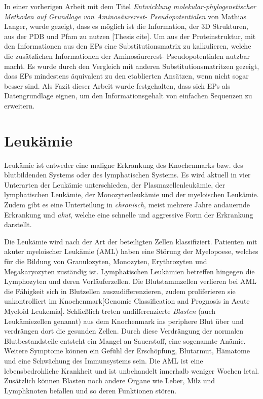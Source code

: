 In einer vorherigen Arbeit mit dem Titel \emph{Entwicklung molekular-phylogenetischer Methoden auf Grundlage von Aminosäurerest- Pseudopotentialen} von Mathias Langer, wurde gezeigt, dass es möglich ist die Information, der 3D Strukturen, aus der PDB und Pfam zu nutzen [Thesis cite]. Um aus der Proteinstruktur, mit den Informationen aus den EPs eine Substitutionsmatrix zu kalkulieren, welche die zusätzlichen Informationen der Aminosäurerest- Pseudopotentialen nutzbar macht. Es wurde durch den Vergleich mit anderen Substitutionsmatritzen gezeigt, dass EPs mindestens äquivalent zu den etablierten Ansätzen, wenn nicht sogar besser sind. Als Fazit dieser Arbeit wurde festgehalten, dass sich EPs als Datengrundlage eignen, um den Informationsgehalt von einfachen Sequenzen zu erweitern.


\section{Leukämie}
Leukämie ist entweder eine maligne Erkrankung des Knochenmarks bzw. des blutbildenden Systems oder des lymphatischen Systems. Es wird aktuell in vier Unterarten der Leukämie unterschieden, der Plasmazellenleukämie, der lymphatischen Leukämie, der Monozytenleukämie und der myeloischen Leukämie. Zudem gibt es eine Unterteilung in \emph{chronisch}, meist mehrere Jahre andauernde Erkrankung und \emph{akut}, welche eine schnelle und aggressive Form der Erkrankung darstellt.

Die Leukämie wird nach der Art der beteiligten Zellen klassifiziert. Patienten mit akuter myeloischer Leukämie (AML) haben eine Störung der Myelopoese, welches für die Bildung von Granulozyten, Monozyten, Erythrozyten und Megakaryozyten zuständig ist. Lymphatischen Leukämien betreffen hingegen die Lymphozyten und deren Vorläuferzellen. Die Blutstammzellen verlieren bei AML die Fähigkeit sich in Blutzellen auszudifferenzieren, zudem proliferieren sie unkontrolliert im Knochenmark[Genomic Classification and Prognosis in Acute Myeloid Leukemia]. Schließlich treten undifferenzierte \emph{Blasten} (auch Leukämiezellen genannt) aus dem Knochenmark ins periphere Blut über und verdrängen dort die gesunden Zellen. Durch diese Verdrängung der normalen Blutbestandsteile entsteht ein Mangel an Sauerstoff, eine sogenannte Anämie. Weitere Symptome können ein Gefühl der Erschöpfung, Blutarmut, Hämatome und eine Schwächung des Immunsystems sein. Die AML ist eine lebensbedrohliche Krankheit und ist unbehandelt innerhalb weniger Wochen letal. Zusätzlich können Blasten noch andere Organe wie Leber, Milz und Lymphknoten befallen und so deren Funktionen stören.

